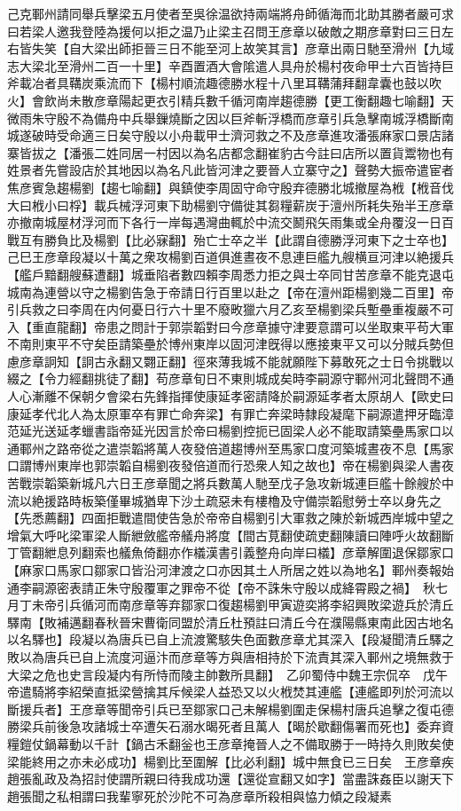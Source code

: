 己克鄆州請同舉兵擊梁五月使者至吳徐温欲持兩端將舟師循海而北助其勝者嚴可求曰若梁人邀我登陸為援何以拒之温乃止梁主召問王彦章以破敵之期彦章對曰三日左右皆失笑【自大梁出師拒晉三日不能至河上故笑其言】彦章出兩日馳至滑州【九域志大梁北至滑州二百一十里】辛酉置酒大會隂遣人具舟於楊村夜命甲士六百皆持巨斧載冶者具鞲炭乘流而下【楊村順流趣德勝水程十八里耳鞲蒲拜翻韋囊也鼓以吹火】會飲尚未散彦章陽起更衣引精兵數千循河南岸趨德勝【更工衡翻趣七喻翻】天微雨朱守殷不為備舟中兵舉鏁燒斷之因以巨斧斬浮橋而彦章引兵急擊南城浮橋斷南城遂破時受命適三日矣守殷以小舟載甲士濟河救之不及彦章進攻潘張麻家口景店諸寨皆拔之【潘張二姓同居一村因以為名店都念翻崔豹古今註曰店所以置貨鬻物也有姓景者先嘗設店於其地因以為名凡此皆河津之要晉人立寨守之】聲勢大振帝遣宦者焦彦賓急趨楊劉【趨七喻翻】與鎮使李周固守命守殷弃德勝北城撤屋為栰【栰音伐大曰栰小曰桴】載兵械浮河東下助楊劉守備徙其芻糧薪炭于澶州所耗失殆半王彦章亦撤南城屋材浮河而下各行一岸每遇灣曲輒於中流交鬭飛矢雨集或全舟覆沒一日百戰互有勝負比及楊劉【比必寐翻】殆亡士卒之半【此謂自德勝浮河東下之士卒也】己巳王彦章段凝以十萬之衆攻楊劉百道俱進晝夜不息連巨艦九艘横亘河津以絶援兵【艦戶黯翻艘蘇遭翻】城垂陷者數四賴李周悉力拒之與士卒同甘苦彦章不能克退屯城南為連營以守之楊劉告急于帝請日行百里以赴之【帝在澶州距楊劉幾二百里】帝引兵救之曰李周在内何憂日行六十里不廢畋獵六月乙亥至楊劉梁兵塹壘重複嚴不可入【重直龍翻】帝患之問計于郭崇韜對曰今彦章據守津要意謂可以坐取東平苟大軍不南則東平不守矣臣請築壘於博州東岸以固河津旣得以應接東平又可以分賊兵勢但慮彦章詗知【詗古永翻又翾正翻】徑來薄我城不能就願陛下募敢死之士日令挑戰以綴之【令力經翻挑徒了翻】苟彦章旬日不東則城成矣時李嗣源守鄆州河北聲問不通人心漸離不保朝夕會梁右先鋒指揮使康延孝密請降於嗣源延孝者太原胡人【歐史曰康延孝代北人為太原軍卒有罪亡命奔梁】有罪亡奔梁時隸段凝麾下嗣源遣押牙臨漳范延光送延孝蠟書詣帝延光因言於帝曰楊劉控扼已固梁人必不能取請築壘馬家口以通鄆州之路帝從之遣崇韜將萬人夜發倍道趨博州至馬家口度河築城晝夜不息【馬家口謂博州東岸也郭崇韜自楊劉夜發倍道而行恐衆人知之故也】帝在楊劉與梁人書夜苦戰崇韜築新城凡六日王彦章聞之將兵數萬人馳至戊子急攻新城連巨艦十餘艘於中流以絶援路時板築僅畢城猶卑下沙土疏惡未有樓櫓及守備崇韜慰勞士卒以身先之【先悉薦翻】四面拒戰遣間使告急於帝帝自楊劉引大軍救之陳於新城西岸城中望之增氣大呼叱梁軍梁人斷紲斂艦帝艤舟將度【間古莧翻使疏吏翻陳讀曰陣呼火故翻斷丁管翻紲息列翻索也艤魚倚翻亦作檥漢書引義整舟向岸曰檥】彦章解圍退保鄒家口【麻家口馬家口鄒家口皆沿河津渡之口亦因其土人所居之姓以為地名】鄆州奏報始通李嗣源密表請正朱守殷覆軍之罪帝不從【帝不誅朱守殷以成絳霄殿之禍】　秋七月丁未帝引兵循河而南彦章等弃鄒家口復趨楊劉甲寅遊奕將李紹興敗梁遊兵於清丘驛南【敗補邁翻春秋晉宋曹衛同盟於清丘杜預註曰清丘今在濮陽縣東南此因古地名以名驛也】段凝以為唐兵已自上流渡驚駭失色面數彦章尤其深入【段凝聞清丘驛之敗以為唐兵已自上流度河逼汴而彦章等方與唐相持於下流責其深入鄆州之境無救于大梁之危也史言段凝内有所恃而陵主帥數所具翻】　乙卯蜀侍中魏王宗侃卒　戊午帝遣騎將李紹榮直抵梁營擒其斥候梁人益恐又以火栰焚其連艦【連艦即列於河流以斷援兵者】王彦章等聞帝引兵已至鄒家口己未解楊劉圍走保楊村唐兵追擊之復屯德勝梁兵前後急攻諸城士卒遭矢石溺水暍死者且萬人【暍於歇翻傷署而死也】委弃資糧鎧仗鍋幕動以千計【鍋古禾翻釡也王彦章掩晉人之不備取勝于一時持久則敗矣使梁能終用之亦未必成功】楊劉比至圍解【比必利翻】城中無食已三日矣　王彦章疾趙張亂政及為招討使謂所親曰待我成功還【還從宣翻又如字】當盡誅姦臣以謝天下趙張聞之私相謂曰我輩寧死於沙陀不可為彦章所殺相與恊力傾之段凝素